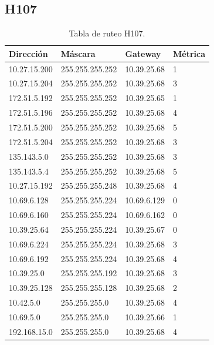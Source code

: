 \documentclass[12pt,titlepage]{article}
\begin{document}
\subsection{H107}
\begin{table}
  \begin{center}
    \begin{tabular}{|l|l|l|l|}
      \hline
        \bf{Direcci\'on} & \bf{M\'ascara} & \bf{Gateway} & \bf{M\'etrica} \\
      \hline 
	10.27.15.200  & 255.255.255.252 & 10.39.25.68 & 1 \\
        10.27.15.204  & 255.255.255.252 & 10.39.25.68 & 3 \\
        172.51.5.192  & 255.255.255.252 & 10.39.25.65 & 1 \\
        172.51.5.196  & 255.255.255.252 & 10.39.25.68 & 4 \\
        172.51.5.200  & 255.255.255.252 & 10.39.25.68 & 5 \\
        172.51.5.204  & 255.255.255.252 & 10.39.25.68 & 3 \\
        135.143.5.0   & 255.255.255.252 & 10.39.25.68 & 3 \\
        135.143.5.4   & 255.255.255.252 & 10.39.25.68 & 5 \\ 	
	10.27.15.192  & 255.255.255.248 & 10.39.25.68 & 4 \\
	10.69.6.128   & 255.255.255.224 & 10.69.6.129 & 0 \\
        10.69.6.160   & 255.255.255.224 & 10.69.6.162 & 0 \\
	10.39.25.64   & 255.255.255.224 & 10.39.25.67 & 0 \\       
	10.69.6.224   & 255.255.255.224 & 10.39.25.68 & 3 \\
	10.69.6.192   & 255.255.255.224 & 10.39.25.68 & 4 \\	
	10.39.25.0    & 255.255.255.192 & 10.39.25.68 & 3 \\
	10.39.25.128  & 255.255.255.128 & 10.39.25.68 & 2 \\
	10.42.5.0     & 255.255.255.0 & 10.39.25.68 & 4 \\
        10.69.5.0     & 255.255.255.0 & 10.39.25.66 & 1 \\
        192.168.15.0  & 255.255.255.0 & 10.39.25.68 & 4 \\  
    \hline
    \end{tabular} \\
  \end{center}
  \caption{Tabla de ruteo H107.}
\end{table}
\FloatBarrier
\end{document}
